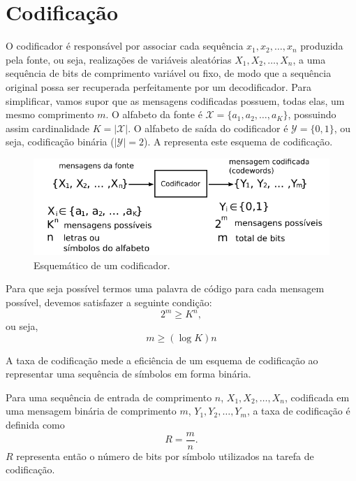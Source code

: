 \section{Codificação}

O codificador é responsável por associar cada sequência $x_1,x_2,\ldots,x_n$
produzida pela fonte, ou seja, realizações de variáveis aleatórias $X_1,X_2,\ldots,X_n$,
a uma sequência de bits de comprimento variável ou fixo, de modo que a sequência original 
possa ser recuperada perfeitamente por um decodificador. Para simplificar, vamos
supor que as mensagens codificadas possuem, todas elas, um mesmo comprimento $m$.
O alfabeto da fonte é $\mathcal{X} = \{a_1, a_2, \ldots, a_K\}$, possuindo assim 
cardinalidade $K = \vert \mathcal{X} \vert$. O alfabeto
de saída do codificador é $\mathcal{Y} = \{0,1\}$, ou seja, codificação binária ($\vert \mathcal{Y} \vert = 2$).
A  representa este esquema de codificação.

\begin{figure}%
  \centering
  \includegraphics[width=0.8\linewidth]{figures/blockcoding.pdf}
  \caption{Esquemático de um codificador.}
  \label{fig:blockcoding}
\end{figure}

Para que seja possível termos uma palavra de código para cada mensagem possível,
devemos satisfazer a seguinte condição:
\begin{equation}
  2^m \geq K^n ,
\end{equation}
ou seja,
\begin{equation}
  m \geq (\log K) n
\end{equation}

A taxa de codificação mede a eficiência de um esquema de codificação 
ao representar uma sequência de símbolos em forma binária. 
\begin{definition}
  Para uma sequência de entrada de comprimento $n$, $X_1,X_2,\ldots,X_n$,
  codificada em uma mensagem binária de comprimento $m$, $Y_1,Y_2,\ldots,Y_m$,
  a taxa de codificação é definida como
  \begin{equation}
    R = \frac{m}{n} .
  \end{equation}
  $R$ representa então o número de bits por símbolo utilizados na tarefa de codificação.
\end{definition}



